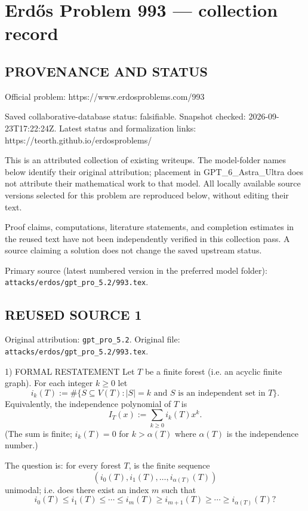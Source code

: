 \section*{Erd\H{o}s Problem 993 --- collection record}

\subsection*{PROVENANCE AND STATUS}
Official problem: https://www.erdosproblems.com/993

Saved collaborative-database status: falsifiable.
Snapshot checked: 2026-09-23T17:22:24Z.
Latest status and formalization links: https://teorth.github.io/erdosproblems/

This is an attributed collection of existing writeups. The model-folder names below identify their original attribution; placement in GPT\_6\_Astra\_Ultra does not attribute their mathematical work to that model. All locally available source versions selected for this problem are reproduced below, without editing their text.

Proof claims, computations, literature statements, and completion estimates in the reused text have not been independently verified in this collection pass. A source claiming a solution does not change the saved upstream status.

Primary source (latest numbered version in the preferred model folder): \texttt{attacks/erdos/gpt\_pro\_5.2/993.tex}.

\subsection*{REUSED SOURCE 1}
Original attribution: \texttt{gpt\_pro\_5.2}.
Original file: \texttt{attacks/erdos/gpt\_pro\_5.2/993.tex}.


1) FORMAL RESTATEMENT
Let $T$ be a finite forest (i.e. an acyclic finite graph).  For each integer $k\ge 0$ let
\[
 i_k(T) := \#\{S\subseteq V(T): |S|=k\text{ and $S$ is an independent set in }T\}.
\]
Equivalently, the independence polynomial of $T$ is
\[
 I_T(x) := \sum_{k\ge 0} i_k(T) x^k.
\]
(The sum is finite; $i_k(T)=0$ for $k>\alpha(T)$ where $\alpha(T)$ is the independence number.)

The question is: for every forest $T$, is the finite sequence
\[
(i_0(T),i_1(T),\dots,i_{\alpha(T)}(T))
\]
unimodal; i.e. does there exist an index $m$ such that
\[
 i_0(T)\le i_1(T)\le\cdots\le i_m(T)\ge i_{m+1}(T)\ge\cdots\ge i_{\alpha(T)}(T)?
\]

